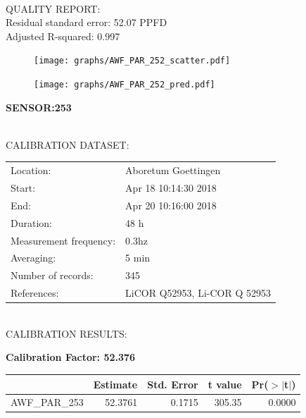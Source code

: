 \documentclass[oneside]{report}
\begin{document}
\hrulefill\\
QUALITY REPORT:\\
Residual standard error: 52.07 PPFD\\
Adjusted R-squared: 0.997



\begin{figure}[H]
  \centering
  \texttt{[image: graphs/AWF\_PAR\_252\_scatter.pdf]}
\end{figure}




\begin{figure}[H]
  \centering
  \texttt{[image: graphs/AWF\_PAR\_252\_pred.pdf]}
\end{figure}

\pagebreak


\begin{center}
\large{\textbf{SENSOR:253}}\\
\end{center}

\hrulefill\\
CALIBRATION DATASET:\\
\begin{table}[h!]
  \centering
  \label{tab:table1}
  \begin{tabular}{ll}
    Location: & Aboretum Goettingen\\ 
    
    
    Start:  & Apr 18 10:14:30 2018 \\
    End:   & Apr 20 10:16:00 2018\\ 
    Duration: & 48 h\\
    Measurement frequency: & 0.3hz\\
    Averaging:  &5 min\\
    Number of records: & 345 \\
    References: & LiCOR Q52953, Li-COR Q 52953 \\
  \end{tabular}
\end{table}

\hrulefill\\
CALIBRATION RESULTS:\\


\begin{center}
\textbf{\large{Calibration Factor: 52.376}}\\
\end{center}
\begin{table}[ht]
\centering
\begin{tabular}{rrrrr}
  \hline
 & Estimate & Std. Error & t value & Pr($>$$|$t$|$) \\ 
  \hline
AWF\_PAR\_253 & 52.3761 & 0.1715 & 305.35 & 0.0000 \\ 
   \hline
\end{tabular}
\end{table}
\end{document}
